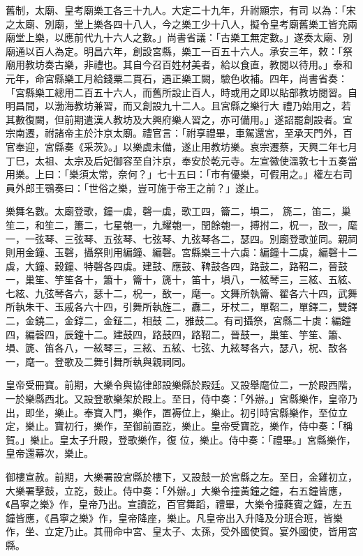 \begin{pinyinscope}
 舊制，太廟、皇考廟樂工各三十九人。大定二十九年，升祔顯宗，有司
 以為：「宋之太廟、別廟，堂上樂各四十八人，今之樂工少十八人，擬令皇考廟舊樂工皆充兩廟堂上樂，以應前代九十六人之數。」尚書省議：「古樂工無定數。」遂奏太廟、別廟通以百人為定。明昌六年，創設宮縣，樂工一百五十六人。承安三年，敕：「祭廟用教坊奏古樂，非禮也。其自今召百姓材美者，給以食直，教閱以待用。」泰和元年，命宮縣樂工月給錢粟二貫石，遇正樂工闕，驗色收補。四年，尚書省奏：「宮縣樂工總用二百五十六人，而舊所設止百人，時或用之即以貼部教坊閱習。自明昌間，以渤海教坊兼習，而又創設九十二人。且宮縣之樂行大
 禮乃始用之，若其數復闕，但前期遣漢人教坊及大興府樂人習之，亦可備用。」遂詔罷創設者。宣宗南遷，祔諸帝主於汴京太廟。禮官言：「祔享禮畢，車駕還宮，至承天門外，百官奉迎，宮縣奏《采茨》。」以樂虡未備，遂止用教坊樂。哀宗遷蔡，天興二年七月丁巳，太祖、太宗及后妃御容至自汴京，奉安於乾元寺。左宣徽使溫敦七十五奏當用樂。上曰：「樂須太常，奈何？」七十五曰：「市有優樂，可假用之。」權左右司員外郎王鶚奏曰：「世俗之樂，豈可施于帝王之前？」遂止。



 樂舞名數。太廟登歌，鐘一虡，磬一虡，歌工四，籥二，塤二，
 篪二，笛二，巢笙二，和笙二，簫二，七星匏一，九耀匏一，閏餘匏一，搏拊二，柷一，敔一，麾一，一弦琴、三弦琴、五弦琴、七弦琴、九弦琴各二，瑟四。別廟登歌並同。親祠則用金鐘、玉磬，攝祭則用編鐘、編磬。宮縣樂三十六虡：編鐘十二虡，編磬十二虡，大鐘、穀鐘、特磬各四虡。建鼓、應鼓、鞞鼓各四，路鼓二，路鞀二，晉鼓一，巢笙、竽笙各十，簫十，籥十，篪十，笛十，塤八，一絃琴三，三絃、五絃、七絃、九弦琴各六，瑟十二，柷一，敔一，麾一。文舞所執籥、翟各六十四，武舞所執朱干、玉戚各六十四，引舞所執旌二，纛二，牙杖二，單鞀二，單鐸二，雙鐸二，金鐃二，金錞二，金鉦二，相鼓
 二，雅鼓二。有司攝祭，宮縣二十虡：編鐘四，編磬四，辰鐘十二。建鼓四，路鼓四，路鞀二，晉鼓一，巢笙、竽笙、簫、塤、篪、笛各八，一絃琴三，三絃、五絃、七弦、九絃琴各六，瑟八，柷、敔各一，麾一。登歌及二舞引舞所執與親祠同。



 皇帝受冊寶。前期，大樂令與協律郎設樂縣於殿廷。又設舉麾位二，一於殿西階，一於樂縣西北。又設登歌樂架於殿上。至日，侍中奏：「外辦。」宮縣樂作，皇帝乃出，即坐，樂止。奉寶入門，樂作，置褥位上，樂止。初引時宮縣樂作，至位立定，樂止。寶初行，樂作，至御前置訖，樂止。皇帝受寶訖，樂作，侍中奏：「稱賀。」樂止。皇太子升殿，登歌樂作，復
 位，樂止。侍中奏：「禮畢。」宮縣樂作，皇帝還幕次，樂止。



 御樓宣赦。前期，大樂署設宮縣於樓下，又設鼓一於宮縣之左。至日，金雞初立，大樂署擊鼓，立訖，鼓止。侍中奏：「外辦。」大樂令撞黃鐘之鐘，右五鐘皆應，《昌寧之樂》作，皇帝乃出。宣讀訖，百官舞蹈，禮畢，大樂令撞蕤賓之鐘，左五鐘皆應，《昌寧之樂》作，皇帝降座，樂止。凡皇帝出入升降及分班合班，皆樂作，坐、立定乃止。其冊命中宮、皇太子、太孫，受外國使賀。宴外國使，皆用宮縣。




\end{pinyinscope}
